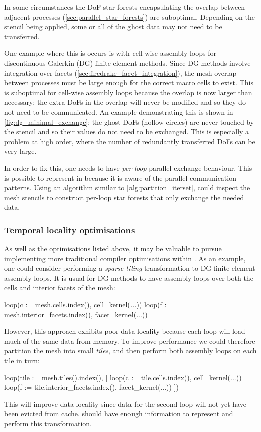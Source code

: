 \documentclass[thesis]{subfiles}
\begin{document}
In some circumstances the DoF star forests encapsulating the overlap between adjacent processes (\cref{sec:parallel_star_forests}) are suboptimal.
Depending on the stencil being applied, some or all of the ghost data may not need to be transferred.

One example where this is occurs is with cell-wise assembly loops for discontinuous Galerkin (DG) finite element methods.
Since DG methods involve integration over facets (\cref{sec:firedrake_facet_integration}), the mesh overlap between processes must be large enough for the correct macro cells to exist.
This is suboptimal for cell-wise assembly loops because the overlap is now larger than necessary: the extra DoFs in the overlap will never be modified and so they do not need to be communicated.
An example demonstrating this is shown in \cref{fig:dg_minimal_exchange}; the ghost DoFs (hollow circles) are never touched by the stencil and so their values do not need to be exchanged.
This is especially a problem at high order, where the number of redundantly transferred DoFs can be very large.

In order to fix this, one needs to have \emph{per-loop} parallel exchange behaviour.
This is possible to represent in  because it is aware of the parallel communication patterns.
Using an algorithm similar to \cref{alg:partition_iterset},  could inspect the mesh stencils to construct per-loop star forests that only exchange the needed data.

\subsubsection{Temporal locality optimisations}

As well as the optimisations listed above, it may be valuable to pursue implementing more traditional compiler optimisations within .
As an example, one could consider performing a \emph{sparse tiling} transformation to DG finite element assembly loops.
It is usual for DG methods to have assembly loops over both the cells and interior facets of the mesh:
\begin{pyinline}
  loop(c := mesh.cells.index(), cell_kernel(...))
  loop(f := mesh.interior_facets.index(), facet_kernel(...))
\end{pyinline}
However, this approach exhibits poor data locality because each loop will load much of the same data from memory.
To improve performance we could therefore partition the mesh into small \emph{tiles}, and then perform both assembly loops on each tile in turn:
\begin{pyinline}
  loop(tile := mesh.tiles().index(), [
    loop(c := tile.cells.index(), cell_kernel(...))
    loop(f := tile.interior_facets.index(), facet_kernel(...))
  ])
\end{pyinline}
This will improve data locality since data for the second loop will not yet have been evicted from cache.
 should have enough information to represent and perform this transformation.
\end{document}
